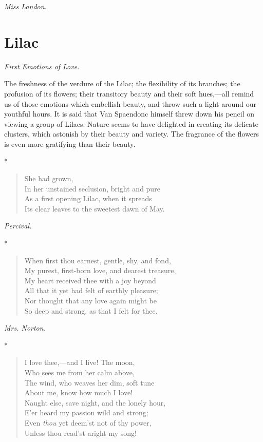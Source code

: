 \documentclass[11pt,twoside]{article}
\newcommand\flower[2]{\section*{#1}\addcontentsline{toc}{section}{#1}%
  \noindent\textit{#2.}\par\medskip}
\newcommand\stars{\begin{center}*\quad*\quad*\end{center}}
\newcommand\by[1]{\par\hfill\textit{#1}\par}
\begin{document}
\by{Miss Landon.}

\flower{Lilac}{First Emotions of Love}

The freshness of the verdure of the Lilac; the flexibility of its branches; the profusion of its flowers; their transitory beauty and their soft hues,---all remind us of those emotions which embellish beauty, and throw such a light around our youthful hours. It is said that Van Spaendonc himself threw down his pencil on viewing a group of Lilacs. Nature seems to have delighted in creating its delicate clusters, which astonish by their beauty and variety. The fragrance of the flowers is even more gratifying than their beauty.

\stars

\begin{verse}
\quad She had grown,\\
In her unstained seclusion, bright and pure\\
As a first opening Lilac, when it spreads\\
Its clear leaves to the sweetest dawn of May.
\end{verse}

\by{Percival.}

\stars

\begin{verse}
When first thou earnest, gentle, shy, and fond,\\
\quad My purest, first-born love, and dearest treasure,\\
My heart received thee with a joy beyond\\
\quad All that it yet had felt of earthly pleasure;\\
Nor thought that any love again might be\\
So deep and strong, as that I felt for thee.
\end{verse}

\by{Mrs. Norton.}

\stars

\begin{verse}
I love thee,---and I live! The moon,\\
\quad Who sees me from her calm above,\\
The wind, who weaves her dim, soft tune\\
\quad About me, know how much I love!\\
Naught else, save night, and the lonely hour,\\
\quad E’er heard my passion wild and strong;\\
Even \emph{thou} yet deem’st not of thy power,\\
Unless thou read’st aright my song!
\end{verse}
\end{document}
